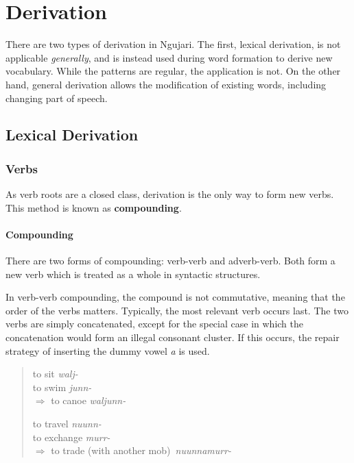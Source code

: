 \chapter{Derivation}

There are two types of derivation in Ngujari. The first, lexical derivation, is
not applicable \textit{generally}, and is instead used during word formation to
derive new vocabulary. While the patterns are regular, the application is not.
On the other hand, general derivation allows the modification of existing words,
including changing part of speech.

\section{Lexical Derivation}

\subsection{Verbs}

As verb roots are a closed class, derivation is the only way to form new verbs.
This method is known as \textbf{compounding}.

\subsubsection{Compounding}

There are two forms of compounding: verb-verb and adverb-verb. Both form a new
verb which is treated as a whole in syntactic structures.

In verb-verb compounding, the compound is not commutative, meaning that the
order of the verbs matters. Typically, the most relevant verb occurs last. The
two verbs are simply concatenated, except for the special case in which the
concatenation would form an illegal consonant cluster. If this occurs, the
repair strategy of inserting the dummy vowel \textit{a} is used.

\begin{quote}
\begin{multicols}{2}
to sit \textit{walj-}\\
to swim \textit{junn-}\\
$\Rightarrow$ to canoe \textit{waljunn-}

to travel \textit{nuunn-}\\
to exchange \textit{murr-}\\
$\Rightarrow$ to trade (with another mob)~\textit{nuunnamurr-}
\end{multicols}
\end{quote}

